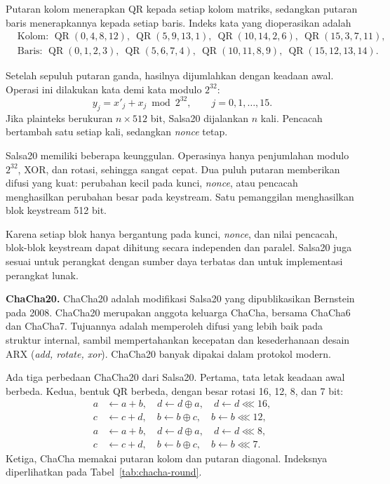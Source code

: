 Putaran kolom menerapkan QR kepada setiap kolom matriks, sedangkan putaran
baris menerapkannya kepada setiap baris. Indeks kata yang dioperasikan adalah
\[
\begin{aligned}
&\text{Kolom: } \operatorname{QR}(0,4,8,12),\
\operatorname{QR}(5,9,13,1),\
\operatorname{QR}(10,14,2,6),\
\operatorname{QR}(15,3,7,11),\\
&\text{Baris: } \operatorname{QR}(0,1,2,3),\
\operatorname{QR}(5,6,7,4),\
\operatorname{QR}(10,11,8,9),\
\operatorname{QR}(15,12,13,14).
\end{aligned}
\]

Setelah sepuluh putaran ganda, hasilnya dijumlahkan dengan keadaan awal. Operasi
ini dilakukan kata demi kata modulo $2^{32}$:
\begin{equation}
y_j = x'_j + x_j \bmod 2^{32}, \qquad j = 0, 1, \dots, 15 .
\label{eq:salsa-final}
\end{equation}
Jika plainteks berukuran $n \times 512$ bit, Salsa20 dijalankan $n$ kali.
Pencacah bertambah satu setiap kali, sedangkan \textit{nonce} tetap.

Salsa20 memiliki beberapa keunggulan. Operasinya hanya penjumlahan modulo
$2^{32}$, XOR, dan rotasi, sehingga sangat cepat. Dua puluh putaran memberikan
difusi yang kuat: perubahan kecil pada kunci, \textit{nonce}, atau pencacah
menghasilkan perubahan besar pada keystream. Satu pemanggilan menghasilkan blok
keystream 512 bit.

Karena setiap blok hanya bergantung pada kunci, \textit{nonce}, dan nilai
pencacah, blok-blok keystream dapat dihitung secara independen dan paralel.
Salsa20 juga sesuai untuk perangkat dengan sumber daya terbatas dan untuk
implementasi perangkat lunak.

\textbf{ChaCha20.} ChaCha20 adalah modifikasi Salsa20 yang dipublikasikan
Bernstein pada 2008. ChaCha20 merupakan anggota keluarga ChaCha, bersama
ChaCha6 dan ChaCha7. Tujuannya adalah memperoleh difusi yang lebih baik pada
struktur internal, sambil mempertahankan kecepatan dan kesederhanaan desain
ARX (\textit{add, rotate, xor}). ChaCha20 banyak dipakai dalam protokol modern.

Ada tiga perbedaan ChaCha20 dari Salsa20. Pertama, tata letak keadaan awal
berbeda. Kedua, bentuk QR berbeda, dengan besar rotasi 16, 12, 8, dan 7 bit:
\[
\begin{aligned}
a &\leftarrow a + b, \quad d \leftarrow d \oplus a, \quad d \leftarrow d \lll 16, \\
c &\leftarrow c + d, \quad b \leftarrow b \oplus c, \quad b \leftarrow b \lll 12, \\
a &\leftarrow a + b, \quad d \leftarrow d \oplus a, \quad d \leftarrow d \lll 8, \\
c &\leftarrow c + d, \quad b \leftarrow b \oplus c, \quad b \leftarrow b \lll 7 .
\end{aligned}
\]
Ketiga, ChaCha memakai putaran kolom dan putaran diagonal. Indeksnya
diperlihatkan pada Tabel~\ref{tab:chacha-round}.

